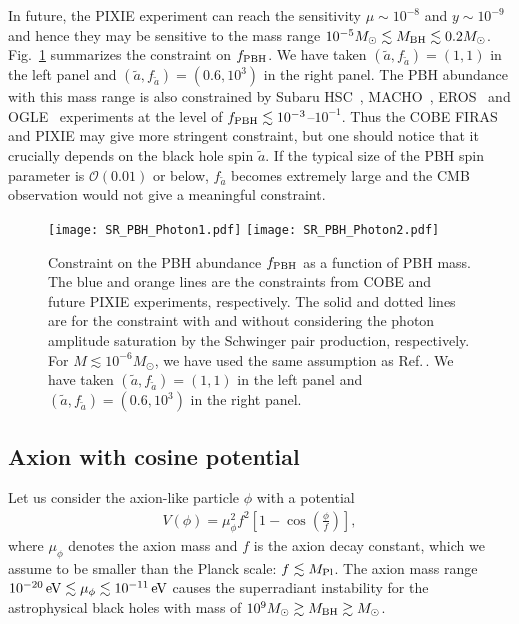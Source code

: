 \documentclass[%
 preprint,
 nofootinbib,
 amsmath,amssymb,
 aps,
 a4paper
]{revtex4-1}
\begin{document}
In future, the PIXIE experiment can reach the sensitivity $\mu \sim 10^{-8}$ and $y\sim 10^{-9}$~\cite{Kogut:2011xw} and hence they may be sensitive to the mass range $10^{-5}M_\odot \lesssim M_{\rm BH} \lesssim 0.2 M_\odot$.
Fig.~\ref{fig:PBH} summarizes the constraint on $f_{\rm PBH}$. We have taken $(\tilde a, f_{\tilde a})=(1,1)$ in the left panel and $(\tilde a, f_{\tilde a})=(0.6,10^3)$ in the right panel. 
The PBH abundance with this mass range is also constrained by Subaru HSC~\cite{Niikura:2017zjd}, MACHO~\cite{Allsman:2000kg}, EROS~\cite{Tisserand:2006zx} and OGLE~\cite{2011MNRAS.416.2949W} experiments at the level of $f_{\rm PBH}\lesssim 10^{-3}$--$10^{-1}$. Thus the COBE FIRAS and PIXIE may give more stringent constraint, but one should notice that it crucially depends on the black hole spin $\tilde a$. If the typical size of the PBH spin parameter is $\mathcal O(0.01)$ or below,  $f_{\tilde a}$ becomes extremely large and the CMB observation would not give a meaningful constraint.


\begin{figure}[t]
\begin{center}
\texttt{[image: SR\_PBH\_Photon1.pdf]}
\texttt{[image: SR\_PBH\_Photon2.pdf]}
\end{center}
\caption{
 Constraint on the PBH abundance $f_{\rm PBH}$ as a function of PBH mass. The blue and orange lines are the constraints from COBE and future PIXIE experiments, respectively. The solid and dotted lines are for the constraint with and without considering the photon amplitude saturation by the Schwinger pair production, respectively. For $M \lesssim 10^{-6}M_\odot$, we have used the same assumption as Ref.\,\cite{Pani:2013hpa}. We have taken $(\tilde a, f_{\tilde a})=(1,1)$ in the left panel and $(\tilde a, f_{\tilde a})=(0.6,10^3)$ in the right panel.
}
\label{fig:PBH}
\end{figure}


\subsection{Axion with cosine potential}  \label{sec:axion}


Let us consider the axion-like particle $\phi$ with a potential
\begin{align}
	V(\phi) = \mu_\phi^2 f^2 \left[1-\cos\left(\frac{\phi}{f}\right) \right],
\end{align}
where $\mu_\phi$ denotes the axion mass and $f$ is the axion decay constant, which we assume to be smaller than the Planck scale: $f\lesssim M_{\rm Pl}$. The axion mass range $10^{-20}\,{\rm eV}\lesssim \mu_\phi\lesssim 10^{-11}\,{\rm eV}$ causes the superradiant instability for the astrophysical black holes with mass of $10^{9} M_{\odot} \gtrsim M_{\rm BH} \gtrsim M_{\odot}$.
\end{document}
